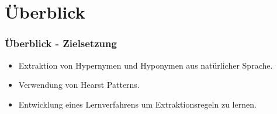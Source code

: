\section{Überblick}
\label{sec:ueberblick}

\begin{frame}
  \frametitle{Überblick - Zielsetzung}

  \begin{itemize}
  \item Extraktion von Hypernymen und Hyponymen aus natürlicher
    Sprache.
  \item Verwendung von Hearst Patterns.
  \item Entwicklung eines Lernverfahrens um Extraktionsregeln zu
    lernen.
  \end{itemize}
\end{frame}
